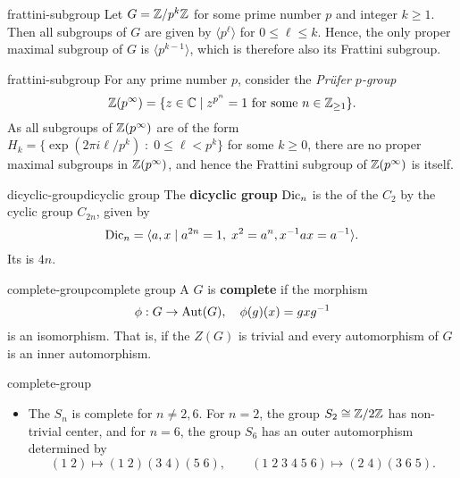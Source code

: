 \begin{example}{frattini-subgroup}
    Let $G = \mathbb{Z}/p^k \mathbb{Z}$ for some prime number $p$ and integer $k \ge 1$. Then all subgroups of $G$ are given by $\langle p^\ell \rangle$ for $0 \le \ell \le k$. Hence, the only proper maximal subgroup of $G$ is $\langle p^{k - 1} \rangle$, which is therefore also its Frattini subgroup.
\end{example}

\begin{example}{frattini-subgroup}
    For any prime number $p$, consider the \textit{Prüfer $p$-group}
    \[ \mathbb{Z}(p^\infty) = \{ z \in \mathbb{C} \mid z^{p^n} = 1 \textup{ for some } n \in \mathbb{Z}_{\ge 1} \} . \]
    As all subgroups of $\mathbb{Z}(p^\infty)$ are of the form $H_k = \{ \exp(2 \pi i \ell / p^k) \;:\; 0 \le \ell < p^k \}$ for some $k \ge 0$, there are no proper maximal subgroups in $\mathbb{Z}(p^\infty)$, and hence the Frattini subgroup of $\mathbb{Z}(p^\infty)$ is itself.
\end{example}

\begin{topic}{dicyclic-group}{dicyclic group}
    The \textbf{dicyclic group} $\textup{Dic}_n$ is the  of the  $C_2$ by the cyclic group $C_{2n}$, given by
    \[ \textup{Dic}_n = \langle a, x \mid a^{2n} = 1, \; x^2 = a^n, x^{-1} a x = a^{-1} \rangle . \]
    Its  is $4n$.
\end{topic}

\begin{topic}{complete-group}{complete group}
    A  $G$ is \textbf{complete} if the morphism
    \[ \phi : G \to \textup{Aut}(G), \quad \phi(g)(x) = g x g^{-1} \]
    is an isomorphism. That is, if the  $Z(G)$ is trivial and every automorphism of $G$ is an inner automorphism.
\end{topic}

\begin{example}{complete-group}
    \begin{itemize}
        \item The  $S_n$ is complete for $n \ne 2, 6$. For $n = 2$, the group $S_2 \cong \mathbb{Z}/2\mathbb{Z}$ has non-trivial center, and for $n = 6$, the group $S_6$ has an outer automorphism determined by
        \[ (1 \; 2) \mapsto (1 \; 2)(3 \; 4) (5 \; 6), \qquad (1 \; 2 \; 3 \; 4 \; 5 \; 6) \mapsto (2 \; 4) (3 \; 6 \; 5) . \]
    \end{itemize}
\end{example}

